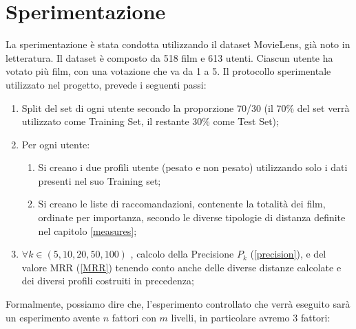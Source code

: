 \section{Sperimentazione}
\label{experiment}

La sperimentazione è stata condotta utilizzando il dataset MovieLens, già noto in letteratura.
Il dataset è composto da 518 film e 613 utenti. Ciascun utente ha votato più film, con una votazione che va da 1 a 5.
Il protocollo sperimentale utilizzato nel progetto, prevede i seguenti passi:
\begin{enumerate}
\item Split del set di ogni utente secondo la proporzione 70/30 (il 70\% del set verrà utilizzato come Training Set, il restante 30\% come Test Set);
\item Per ogni utente:
    \begin{enumerate}
        \item Si creano i due profili utente (pesato e non pesato) utilizzando solo i dati presenti nel suo Training set;
        \item Si creano le liste di raccomandazioni, contenente la totalità dei film, ordinate per importanza, secondo le diverse tipologie di distanza definite nel capitolo \ref{measures};
    \end{enumerate}
\item $\forall k \in (5,10,20,50,100)$ , calcolo della Precisione $P_k$ (\ref{precision}), e del valore MRR (\ref{MRR}) tenendo conto anche delle diverse distanze calcolate e dei diversi profili costruiti in precedenza;
\end{enumerate}
Formalmente, possiamo dire che, l'esperimento controllato che verrà eseguito sarà un esperimento avente $n$ fattori con $m$ livelli, in particolare avremo 3 fattori:
